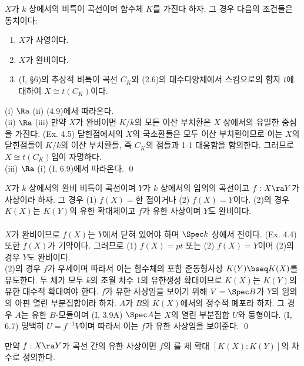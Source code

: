 	
	\begin{proposition}
	$X$가 $k$ 상에서의 비특이 곡선이며 함수체 $K$를 가진다 하자. 그 경우 다음의 조건들은 동치이다:\\
	\begin{enumerate}[label=(\roman*)]
	\item $X$가 사영이다.
	\item $X$가 완비이다.
	\item (I, \S 6)의 추상적 비특이 곡선 $C_K$와 (2.6)의 대수다양체에서 스킴으로의 함자 $t$에 대하여 $X\cong t(C_K)$이다.\\
	\end{enumerate}
	\pf (i) $\Ra$ (ii) (4.9)에서 따라온다.\\
	(ii) $\Ra$ (iii) 만약 $X$가 완비이면 $K/k$의 모든 이산 부치환은 $X$ 상에서의 유일한 중심을 가진다. (Ex. 4.5)
	닫힌점에서의 $X$의 국소환들은 모두 이산 부치환이므로 이는 $X$의 닫힌점들이 $K/k$의 이산 부치환들,
	즉 $C_K$의 점들과 1-1 대응함을 함의한다. 그러므로 $X\cong t(C_K)$임이 자명하다.\\
	(iii) $\Ra$ (i) (I, 6.9)에서 따라온다.
	\qed
	\end{proposition}
	
	
	\begin{proposition}
	$X$가 $k$ 상에서의 완비 비특이 곡선이며 $Y$가 $k$ 상에서의 임의의 곡선이고 $f:X\ra Y$가 사상이라 하자.
	그 경우 (1) $f(X)=$한 점이거나 (2) $f(X)=Y$이다.
	(2)의 경우 $K(X)$는 $K(Y)$의 유한 확대체이고 $f$가 유한 사상이며 $Y$도 완비이다.\\\\
	\pf $X$가 완비이므로 $f(X)$는 $Y$에서 닫혀 있어야 하며 $\Spec k$ 상에서 진이다. (Ex. 4.4)
	또한 $f(X)$가 기약이다. 그러므로 (1) $f(X)=pt$ 또는 (2) $f(X)=Y$이며 (2)의 경우 $Y$도 완비이다.\\
	(2)의 경우 $f$가 우세이며 따라서 이는 함수체의 포함 준동형사상 $K(Y)\bseq K(X)$를 유도한다.
	두 체가 모두 $k$의 초월 차수 1의 유한생성 확대이므로 $K(X)$는 $K(Y)$의 유한 대수적 확대여야 한다.
	$f$가 유한 사상임을 보이기 위해 $V=\Spec B$가 $Y$의 임의의 아핀 열린 부분집합이라 하자.
	$A$가 $B$의 $K(X)$에서의 정수적 폐포라 하자.
	그 경우 $A$는 유한 $B$-모듈이며 (I, 3.9A) $\Spec A$는 $X$의 열린 부분집합 $U$와 동형이다. (I, 6.7)
	명백히 $U=f^{-1}V$이며 따라서 이는 $f$가 유한 사상임을 보여준다.
	\qed
	\end{proposition}
	
	
	\begin{definition}
	만약 $f:X\ra Y$가 곡선 간의 유한 사상이면 $f$의 를 체 확대 $[K(X):K(Y)]$의 차수로 정의한다.
	\end{definition}
	
